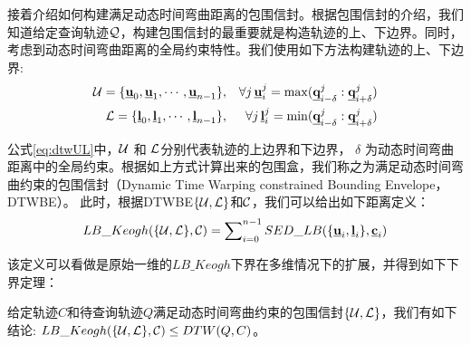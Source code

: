 接着介绍如何构建满足动态时间弯曲距离的包围信封。根据包围信封的介绍，我们知道给定查询轨迹$\cal Q$，构建包围信封的最重要就是构造轨迹的上、下边界。同时，考虑到动态时间弯曲距离的全局约束特性。我们使用如下方法构建轨迹的上、下边界:
\begin{eqnarray}\label{eq:dtwUL}
{\cal U} = \{\emph{{\textbf{u}}}_{0},\emph{{\textbf{u}}}_{1},\cdots, \emph{{\textbf{u}}}_{n-1} \} &,& \forall j  \, \emph{{\textbf{u}}}_{i}^{j}=\max(\emph{{\textbf{q}}}_{i-\delta}^{j} : \emph{{\textbf{q}}}_{i+\delta}^{j}) \nonumber \\
{\cal L} = \{\emph{{\textbf{l}}}_{0},\emph{{\textbf{l}}}_{1},\cdots, \emph{{\textbf{l}}}_{n-1} \}&,& \forall j  \, \emph{{\textbf{l}}}_{i}^{j}=\min(\emph{{\textbf{q}}}_{i-\delta}^{j} : \emph{{\textbf{q}}}_{i+\delta}^{j})
\end{eqnarray}

公式\ref{eq:dtwUL}中，${\cal U}$ 和 ${\cal L}$分别代表轨迹的上边界和下边界， $\delta$ 为动态时间弯曲距离中的全局约束。根据如上方式计算出来的包围盒，我们称之为满足动态时间弯曲约束的包围信封（Dynamic Time Warping constrained Bounding Envelope，DTWBE）。
此时，根据DTWBE$\{{\cal U}, {\cal L}\}  $和$\cal C$，我们可以给出如下距离定义：
\begin{equation}\label{eq:LBKeogh}
LB\_Keogh({\{\cal U,\cal L\},{\cal C}})=  \sum\nolimits_{i=0}^{n-1}	SED\_LB(\{{\emph{{\textbf{u}}}_{i}},\emph{{\textbf{l}}}_{i} \},\emph{{\textbf{c}}}_{i})
\end{equation}



该定义可以看做是原始一维的$LB\_Keogh$下界在多维情况下的扩展，并得到如下下界定理：
\begin{theorem}\label{theorem:DTWLBK}
	给定轨迹$C$和待查询轨迹$Q$满足动态时间弯曲约束的包围信封$\{{\cal U}, {\cal L}\}$，我们有如下结论: $LB\_Keogh({\{\cal U,\cal L\},{\cal C}}) \le DTW(Q,C)$。
\end{theorem}

